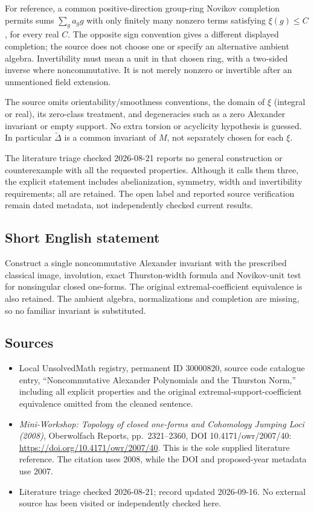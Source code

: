 \documentclass[11pt]{article}
\begin{document}
For reference, a common positive-direction group-ring Novikov completion permits sums \(\sum_g a_gg\) with only finitely many nonzero terms satisfying \(\xi(g)\leq C\), for every real \(C\). The opposite sign convention gives a different displayed completion; the source does not choose one or specify an alternative ambient algebra. Invertibility must mean a unit in that chosen ring, with a two-sided inverse where noncommutative. It is not merely nonzero or invertible after an unmentioned field extension.

The source omits orientability/smoothness conventions, the domain of \(\xi\) (integral or real), its zero-class treatment, and degeneracies such as a zero Alexander invariant or empty support. No extra torsion or acyclicity hypothesis is guessed. In particular \(\widetilde\Delta\) is a common invariant of \(M\), not separately chosen for each \(\xi\).

The literature triage checked 2026-08-21 reports no general construction or counterexample with all the requested properties. Although it calls them three, the explicit statement includes abelianization, symmetry, width and invertibility requirements; all are retained. The open label and reported source verification remain dated metadata, not independently checked current results.
\subsection{Short English statement}
Construct a single noncommutative Alexander invariant with the prescribed classical image, involution, exact Thurston-width formula and Novikov-unit test for nonsingular closed one-forms. The original extremal-coefficient equivalence is also retained. The ambient algebra, normalizations and completion are missing, so no familiar invariant is substituted.
\subsection{Sources}
\begin{itemize}
\item Local UnsolvedMath registry, permanent ID 30000820, source code catalogue entry, ``Noncommutative Alexander Polynomials and the Thurston Norm,'' including all explicit properties and the original extremal-support-coefficient equivalence omitted from the cleaned sentence.
\item \emph{Mini-Workshop: Topology of closed one-forms and Cohomology Jumping Loci (2008)}, Oberwolfach Reports, pp.\ 2321--2360, DOI 10.4171/owr/2007/40: \url{https://doi.org/10.4171/owr/2007/40}. This is the sole supplied literature reference. The citation uses 2008, while the DOI and proposed-year metadata use 2007.
\item Literature triage checked 2026-08-21; record updated 2026-09-16. No external source has been visited or independently checked here.
\end{itemize}
\end{document}
